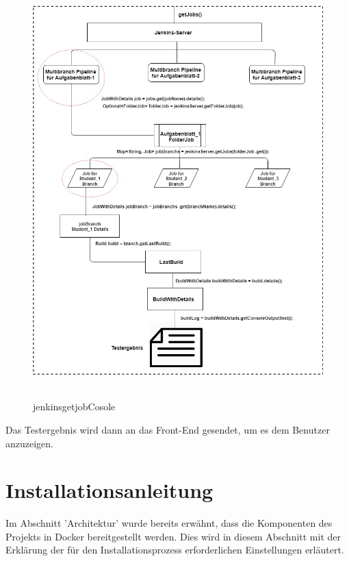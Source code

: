\documentclass[a4paper,12pt,oneside]{book}
\begin{document}
 \begin{figure}[h!]
 	\begin{center}
 		\includegraphics[width=14cm, height=16cm]{TestergebnisOutput.jpg}
 		\caption{jenkinsgetjobCosole} 
 		\label{jenkinsgetjobCosole} 
 	\end{center}
 \end{figure}

Das Testergebnis wird dann an das Front-End gesendet, um es dem Benutzer anzuzeigen.
\newpage
\section{Installationsanleitung}
Im Abschnitt 'Architektur' wurde bereits erwähnt, dass die Komponenten des Projekts in Docker bereitgestellt werden. Dies wird in diesem Abschnitt mit der Erklärung der für den Installationsprozess erforderlichen Einstellungen erläutert.
\end{document}
